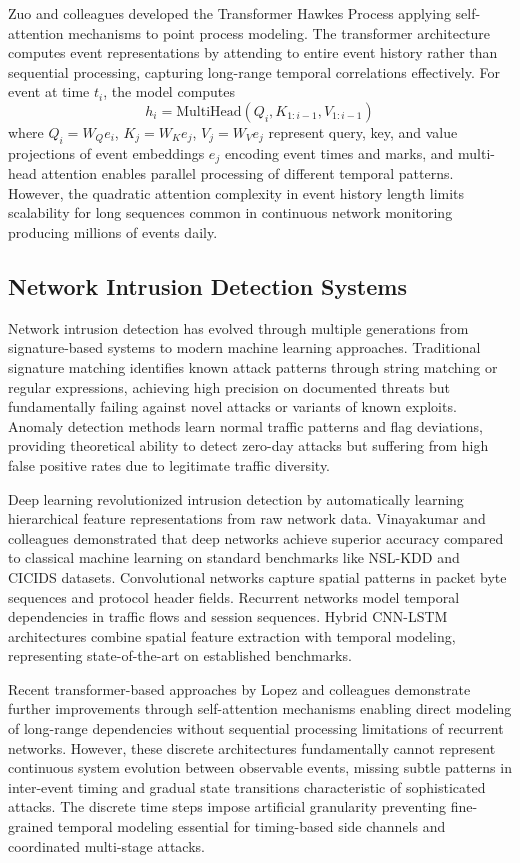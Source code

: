 \documentclass[10pt,journal,compsoc]{IEEEtran}
\begin{document}
Zuo and colleagues developed the Transformer Hawkes Process applying self-attention mechanisms to point process modeling. The transformer architecture computes event representations by attending to entire event history rather than sequential processing, capturing long-range temporal correlations effectively. For event at time $t_i$, the model computes
\begin{equation}
h_i = \mathrm{MultiHead}(Q_i, K_{1:i-1}, V_{1:i-1})
\end{equation}
where $Q_i = W_Q e_i$, $K_j = W_K e_j$, $V_j = W_V e_j$ represent query, key, and value projections of event embeddings $e_j$ encoding event times and marks, and multi-head attention enables parallel processing of different temporal patterns. However, the quadratic attention complexity in event history length limits scalability for long sequences common in continuous network monitoring producing millions of events daily.

\subsection{Network Intrusion Detection Systems}

Network intrusion detection has evolved through multiple generations from signature-based systems to modern machine learning approaches. Traditional signature matching identifies known attack patterns through string matching or regular expressions, achieving high precision on documented threats but fundamentally failing against novel attacks or variants of known exploits. Anomaly detection methods learn normal traffic patterns and flag deviations, providing theoretical ability to detect zero-day attacks but suffering from high false positive rates due to legitimate traffic diversity.

Deep learning revolutionized intrusion detection by automatically learning hierarchical feature representations from raw network data. Vinayakumar and colleagues demonstrated that deep networks achieve superior accuracy compared to classical machine learning on standard benchmarks like NSL-KDD and CICIDS datasets. Convolutional networks capture spatial patterns in packet byte sequences and protocol header fields. Recurrent networks model temporal dependencies in traffic flows and session sequences. Hybrid CNN-LSTM architectures combine spatial feature extraction with temporal modeling, representing state-of-the-art on established benchmarks.

Recent transformer-based approaches by Lopez and colleagues demonstrate further improvements through self-attention mechanisms enabling direct modeling of long-range dependencies without sequential processing limitations of recurrent networks. However, these discrete architectures fundamentally cannot represent continuous system evolution between observable events, missing subtle patterns in inter-event timing and gradual state transitions characteristic of sophisticated attacks. The discrete time steps impose artificial granularity preventing fine-grained temporal modeling essential for timing-based side channels and coordinated multi-stage attacks.
\end{document}
